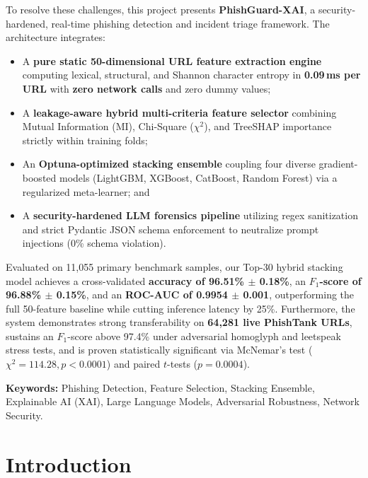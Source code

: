 \documentclass[12pt,a4paper,oneside]{report}
\begin{document}
To resolve these challenges, this project presents \textbf{PhishGuard-XAI}, a security-hardened, real-time phishing detection and incident triage framework. The architecture integrates:
\begin{itemize}
    \item A \textbf{pure static 50-dimensional URL feature extraction engine} computing lexical, structural, and Shannon character entropy in \textbf{0.09\,ms per URL} with \textbf{zero network calls} and zero dummy values;
    \item A \textbf{leakage-aware hybrid multi-criteria feature selector} combining Mutual Information (MI), Chi-Square ($\chi^2$), and TreeSHAP importance strictly within training folds;
    \item An \textbf{Optuna-optimized stacking ensemble} coupling four diverse gradient-boosted models (LightGBM, XGBoost, CatBoost, Random Forest) via a regularized meta-learner; and
    \item A \textbf{security-hardened LLM forensics pipeline} utilizing regex sanitization and strict Pydantic JSON schema enforcement to neutralize prompt injections (0\% schema violation).
\end{itemize}

Evaluated on 11,055 primary benchmark samples, our Top-30 hybrid stacking model achieves a cross-validated \textbf{accuracy of 96.51\% $\pm$ 0.18\%}, an \textbf{$F_1$-score of 96.88\% $\pm$ 0.15\%}, and an \textbf{ROC-AUC of 0.9954 $\pm$ 0.001}, outperforming the full 50-feature baseline while cutting inference latency by 25\%. Furthermore, the system demonstrates strong transferability on \textbf{64,281 live PhishTank URLs}, sustains an $F_1$-score above 97.4\% under adversarial homoglyph and leetspeak stress tests, and is proven statistically significant via McNemar's test ($\chi^2 = 114.28, p < 0.0001$) and paired $t$-tests ($p = 0.0004$).

\vfill
\noindent
\textbf{Keywords:} Phishing Detection, Feature Selection, Stacking Ensemble, Explainable AI (XAI), Large Language Models, Adversarial Robustness, Network Security.

\newpage
\tableofcontents
\newpage
\listoffigures
\newpage
\listoftables

\newpage
{}
\chapter{Introduction}
\end{document}
